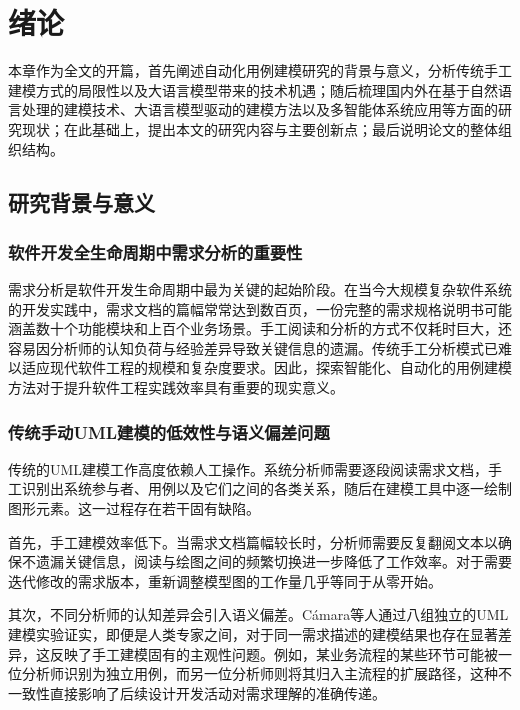 \chapter{绪论}
\vspace{7pt}

本章作为全文的开篇，首先阐述自动化用例建模研究的背景与意义，分析传统手工建模方式的局限性以及大语言模型带来的技术机遇；随后梳理国内外在基于自然语言处理的建模技术、大语言模型驱动的建模方法以及多智能体系统应用等方面的研究现状；在此基础上，提出本文的研究内容与主要创新点；最后说明论文的整体组织结构。

\section{研究背景与意义}

\subsection{软件开发全生命周期中需求分析的重要性}

需求分析是软件开发生命周期中最为关键的起始阶段。在当今大规模复杂软件系统的开发实践中，需求文档的篇幅常常达到数百页，一份完整的需求规格说明书可能涵盖数十个功能模块和上百个业务场景。手工阅读和分析的方式不仅耗时巨大，还容易因分析师的认知负荷与经验差异导致关键信息的遗漏。传统手工分析模式已难以适应现代软件工程的规模和复杂度要求。因此，探索智能化、自动化的用例建模方法对于提升软件工程实践效率具有重要的现实意义。

\subsection{传统手动UML建模的低效性与语义偏差问题}

传统的UML建模工作高度依赖人工操作。系统分析师需要逐段阅读需求文档，手工识别出系统参与者、用例以及它们之间的各类关系，随后在建模工具中逐一绘制图形元素。这一过程存在若干固有缺陷。

首先，手工建模效率低下。当需求文档篇幅较长时，分析师需要反复翻阅文本以确保不遗漏关键信息，阅读与绘图之间的频繁切换进一步降低了工作效率。对于需要迭代修改的需求版本，重新调整模型图的工作量几乎等同于从零开始。

其次，不同分析师的认知差异会引入语义偏差。Cámara等人\cite{camara2023assessment}通过八组独立的UML建模实验证实，即便是人类专家之间，对于同一需求描述的建模结果也存在显著差异，这反映了手工建模固有的主观性问题。例如，某业务流程的某些环节可能被一位分析师识别为独立用例，而另一位分析师则将其归入主流程的扩展路径，这种不一致性直接影响了后续设计开发活动对需求理解的准确传递。

